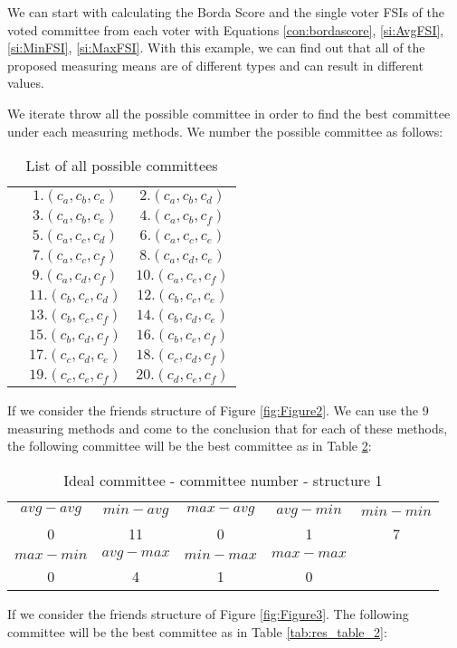 \documentclass{article}
\begin{document}
We can start with calculating the Borda Score  and the single voter FSIs of the voted committee from each voter with Equations \ref{con:bordascore}, \ref{si:AvgFSI}, \ref{si:MinFSI}, \ref{si:MaxFSI}. 
With this example, we can find out that all of the proposed measuring means are of different types and can result in different values. 

We iterate throw all the possible committee in order to find the best committee under each measuring methods. We number the possible committee as follows:
    

\begin{table}[h]
                        \caption{List of all possible committees}
    \centering
    \begin{tabular}{ccc}
         &$1. (c_a, c_b, c_c)$&$2. (c_a, c_b, c_d)$\\
         &$3.(c_a,c_b, c_e)$&$4. (c_a, c_b, c_f)$\\
         &$5. (c_a, c_c,c_d)$&$6. (c_a, c_c, c_e)$\\
         &$7. (c_a, c_c, c_f)$&$8. (c_a, c_d, c_e)$\\
         &$9. (c_a, c_d, c_f)$&$10. (c_a, c_e, c_f)$\\
         &$11. (c_b, c_c, c_d)$&$12. (c_b, c_c, c_e)$\\
         &$13.(c_b, c_c, c_f)$&$14. (c_b, c_d, c_e)$\\
         &$15.(c_b, c_d, c_f)$&$16. (c_b, c_e, c_f)$\\
         &$17. (c_c, c_d, c_e)$&$18.(c_c, c_d, c_f)$\\
         &$19. (c_c, c_e, c_f)$&$20.(c_d, c_e, c_f)$\\
    \end{tabular}
    
    \label{tab:my_label}
\end{table}
If we consider the friends structure of Figure \ref{fig:Figure2}. We can use the 9 measuring methods and come to the conclusion that for each of these methods, the following committee will be the best committee as in Table \ref{tab:res_table_1}:

\begin{table}[h] 
\caption{Ideal committee - committee number - structure 1 }
    \centering
     \centering
        \begin{tabular}{ccccc}
             $avg-avg$&  $min-avg$&  $max-avg$&  $avg-min$& $min-min$\\
             0&  11&  0&  1& 7\\
             $max-min$&  $avg-max$&  $min-max$&  $max-max$& \\
             0&  4&  1&  0& \\
    \end{tabular}
  
    \label{tab:res_table_1}
\end{table}
If we consider the friends structure of Figure \ref{fig:Figure3}. The following committee will be the best committee as in Table \ref{tab:res_table_2}:
\end{document}
